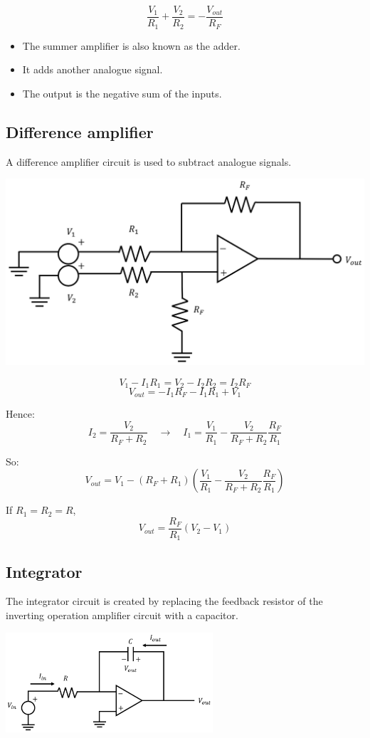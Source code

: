 \documentclass[11pt]{article}
\begin{document}
\[\frac{V_1}{R_1} + \frac{V_2}{R_2} = - \frac{V_{out}}{R_F}\]

\begin{itemize}
\item The summer amplifier is also known as the adder.
\item It adds another analogue signal.
\item The output is the negative sum of the inputs.
\end{itemize}
\subsection{Difference amplifier}
\label{sec:org141ae89}
A difference amplifier circuit is used to subtract analogue signals.

\begin{center}
\includegraphics[width=.9\linewidth]{./images/difference-amplifier-circuit.png}
\end{center}

\[V_1 - I_1 R_1 = V_2 - I_2 R_2 = I_2 R_F\]
\[V_{out} = - I_1 R_F - I_1 R_1 + V_1\]

Hence:
\[I_2 = \frac{V_2}{R_F + R_2} \quad \rightarrow \quad I_1 = \frac{V_1}{R_1} - \frac{V_2}{R_F + R_2} \frac{R_F}{R_1}\]

So:
\[V_{out} = V_1 - (R_F + R_1) \left(\frac{V_1}{R_1} - \frac{V_2}{R_F + R_2} \frac{R_F}{R_1} \right)\]

If \(R_1 = R_2 = R\),
\[V_{out} = \frac{R_F}{R_1} (V_2 - V_1)\]

 \newpage
\subsection{Integrator}
\label{sec:orgc71de96}
The integrator circuit is created by replacing the feedback resistor of the inverting operation amplifier circuit with a capacitor.

\begin{center}
\includegraphics[height=10em]{./images/integrator-circuit.png}
\end{center}
\end{document}
